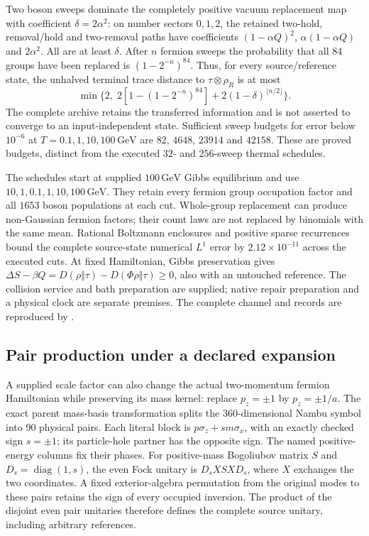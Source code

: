 Two boson sweeps dominate the completely positive vacuum replacement
map with coefficient $\delta=2\alpha^2$: on number sectors $0,1,2$,
the retained two-hold, removal/hold and two-removal paths have coefficients
$(1-\alpha Q)^2$, $\alpha(1-\alpha Q)$ and $2\alpha^2$.
All are at least $\delta$. After $n$ fermion sweeps the probability that
all $84$ groups have been replaced is $(1-2^{-n})^{84}$. Thus, for every
source/reference state, the unhalved terminal trace distance to
$\tau\otimes\rho_R$ is at most
\[
 \min\{2,\;2[1-(1-2^{-n})^{84}]+2(1-\delta)^{\lfloor n/2\rfloor}\}.
\]
The complete archive retains the transferred information and is not
asserted to converge to an input-independent state. Sufficient sweep
budgets for error below $10^{-6}$ at $T=0.1,1,10,100\,\mathrm{GeV}$ are
$82$, $4648$, $23914$ and $42158$. These are proved budgets, distinct
from the executed $32$- and $256$-sweep thermal schedules.

The schedules start at supplied $100\,\mathrm{GeV}$ Gibbs equilibrium
and use $10,1,0.1,1,10,100\,\mathrm{GeV}$. They retain every fermion
group occupation factor and all $1653$ boson populations at each cut.
Whole-group replacement can produce non-Gaussian fermion factors; their
count laws are not replaced by binomials with the same mean. Rational
Boltzmann enclosures and positive sparse recurrences bound the complete
source-state numerical $L^1$ error by $2.12\times10^{-11}$ across the
executed cuts. At fixed Hamiltonian, Gibbs preservation gives
$\Delta S-\beta Q=D(\rho\Vert\tau)-D(\Phi\rho\Vert\tau)\geq0$,
also with an untouched reference. The collision service and bath
preparation are supplied; native repair preparation and a physical clock
are separate premises. The complete channel and records are reproduced
by  \cite{ophrepo}.

\subsection{Pair production under a declared expansion}

A supplied scale factor can also change the actual two-momentum fermion
Hamiltonian while preserving its mass kernel: replace $p_z=\pm1$ by
$p_z=\pm1/a$. The exact parent mass-basis transformation splits the
$360$-dimensional Nambu symbol into $90$ physical pairs. Each literal
block is $p\sigma_z+s m\sigma_x$, with an exactly checked sign
$s=\pm1$; its particle-hole partner has the opposite sign. The named
positive-energy columns fix their phases. For positive-mass Bogoliubov
matrix $S$ and $D_s=\operatorname{diag}(1,s)$, the even Fock unitary is
$D_sXSXD_s$, where $X$ exchanges the two coordinates. A fixed
exterior-algebra permutation from the original modes to these pairs
retains the sign of every occupied inversion. The product of the
disjoint even pair unitaries therefore defines the complete source
unitary, including arbitrary references.

